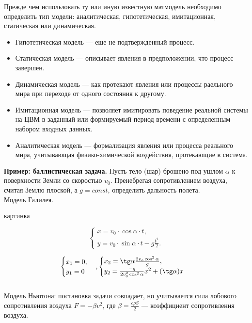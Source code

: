 \documentclass[12pt]{article}
\begin{document}
Прежде чем использовать ту или иную известную матмодель необходимо определить тип модели: аналитическая, гипотетическая, имитационная, статическая или динамическая.

\begin{itemize}
    \item[]Гипотетическая модель --- еще не подтвержденный процесс.
    \item[]Статическая модель --- описывает явления в предположении, что процесс завершен.
    \item[]Динамическая модель --- как протекают явления или процессы раельного мира при переходе от одного состояния к другому.
    \item[]Имитационная модель --- позволяет имитировать поведение реальной системы на ЦВМ в заданный или формируемый период времени с определенным набором входных данных.
    \item[]Аналитическая модель --- формализация явления или процесса реального мира, учитывающая физико-химической воздействия, протекающие в система.
\end{itemize}

\textbf{Пример: баллистическая задача.} Пусть тело (шар) брошено под ушлом $\alpha$ к поверхности Земли со скоростью $v_0$. Пренебрегая сопротивлением воздуха, считая Землю плоской, а $g = const$, определить дальность полета.\\

Модель Галилея.

\begin{center}
    картинка
\end{center}

\[\begin{cases}
    x = v_0 \cdot \cos \alpha \cdot t,\\
    y = v_0 \cdot \sin \alpha \cdot t - g \frac{t^2}{2}.    
\end{cases}\]

\[\begin{cases}
    x_1 = 0,\\
    y_1 = 0
\end{cases},
\begin{cases}
    x_2 = \tg \alpha \frac{2 v_o \cos^2 \alpha}{g},\\
    y_2 = \frac{-g}{2 v_0^2 \cos^2 \alpha} x^2 + (\tg \alpha) x
\end{cases}
\]\\

Модель Ньютона: постановка задачи совпадает, но учитывается сила лобового сопротивления воздуха $F = -\beta v^2$, где $\beta = \frac{c \rho S}{2}$ --- коэффициент сопротивления воздуха.
\end{document}

